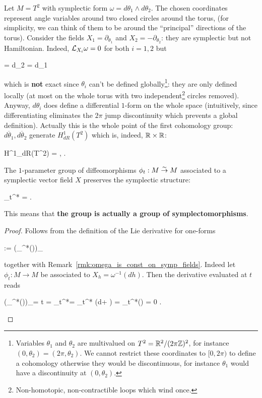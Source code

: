 \documentclass[main.tex]{subfiles}
\begin{document}
\begin{example}
	Let $M = T^2$ with symplectic form $\omega = d\theta_1 \wedge d\theta_2$. The chosen coordinates represent angle variables around two closed circles around the torus, (for simplicity, we can think of them to be around the ``principal'' directions of the torus). Consider the fields $X_1 = \partial_{\theta_1}$ and $X_2 = -\partial_{\theta_2}$: they are symplectic but not Hamiltonian. Indeed, $\mathcal{L}_{X_i} \omega = 0$ for both $i=1,2$ but
	\begin{eqalign}
		 \omega = d\theta_{2}
		\qquad {} \qquad
		 \omega = d\theta_{1}
	\end{eqalign}
	which is \textbf{not} exact since $\theta_i$ can't be defined globally\footnote{Variables $\theta_1$ and $\theta_2$ are multivalued on $T^2 = \mathbb{R}^2/(2\pi\mathbb{Z})^2$, for instance $(0,\theta_2) = (2\pi, \theta_2)$. We cannot restrict these coordinates to $[0, 2\pi)$ to define a cohomology otherwise they would be discontinuous, for instance $\theta_1$ would have a discontinuity at $(0, \theta_2)$.}: they are only defined locally (at most on the whole torus with two independent\footnote{Non-homotopic, non-contractible loops which wind once.} circles removed). Anyway, $d\theta_i$ does define a differential $1$-form on the whole space (intuitively, since differentiating eliminates the $2\pi$ jump discontinuity which prevents a global definition). Actually this is the whole point of the first cohomology group: $\overline{d\theta_1}, \overline{d\theta_2}$ generate $H^1_{dR}(T^2)$ which is, indeed, $\mathbb{R} \times \mathbb{R}$:
	\begin{eqalign}
		H^1_{dR}(T^2) = \langle {},  \rangle \iso \R \times \R .
	\end{eqalign}
\end{example}

\begin{theorem}
\label{th:flow_of_symp_field}
	The $1$-parameter group of diffeomorphisms $\phi_t : M \overset{\sim}\to M$ associated to a symplectic vector field $X$ preserves the symplectic structure:
	\begin{eqalign}
	\label{eq:ham_flow_sympl}
		\phi_t^* \omega = \omega.
	\end{eqalign}
	This means that \textbf{the group is actually a group of symplectomorphisms}.
\end{theorem}
\begin{proof}
	Follows from the definition of the Lie derivative for one-forms
	\begin{eqalign}
		\omega := \der{}{\epsilon}(\phi_\epsilon^*(\omega))\vert_{\epsilon=0}
	\end{eqalign}
	together with Remark~\ref{rmk:omega_is_const_on_symp_fields}. Indeed let $\phi_t : M \to M$ be associated to $X_h = \omega^{-1}(dh)$. Then the derivative evaluated at $t$ reads
	\begin{eqalign}
		\der{}{\epsilon}(\phi_\epsilon^*(\omega))\vert_{\epsilon = t} = \phi_t^*\omega = \phi_t^* (d\omega + ) = \phi_t^*() = 0 .
	\end{eqalign}
\end{proof}
\end{document}
